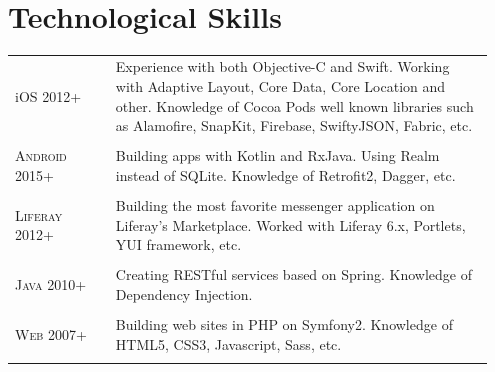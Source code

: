 \documentclass[10pt]{article} %
\begin{document}
{\begin{minipage}[t]{0.5\textwidth}
\begin{tabular}{@{}rl@{}}
\end{tabular}\\[10pt]



\section{Technological Skills} 

\medskip
\begin{tabular}{@{}p{0.2\linewidth}p{0.75\linewidth}@{}} 

\large{i}\textsc{OS} \newline \small\textsc{2012+} & 
Experience with both Objective-C and Swift. Working with Adaptive Layout, Core Data, Core Location and other.\newline
Knowledge of Cocoa Pods well known libraries such as Alamofire, SnapKit, Firebase, 
\newline SwiftyJSON, Fabric, etc. \\
&\\

\large\textsc{Android} \newline \small\textsc{2015+} & 
Building apps with Kotlin and RxJava. Using Realm instead of SQLite.
Knowledge of  Retrofit2, Dagger, etc. \\
&\\

\large\textsc{Liferay} \newline \small\textsc{2012+} & 
Building the most favorite messenger application on Liferay's Marketplace.
Worked with Liferay 6.x, Portlets, YUI framework, etc. \\
&\\

\large\textsc{Java} \newline \small\textsc{2010+} & 
Creating RESTful services based on Spring. Knowledge of Dependency Injection. \\
&\\

\large\textsc{Web} \newline \small\textsc{2007+} & 
Building web sites in PHP on Symfony2. Knowledge of HTML5, CSS3, Javascript, Sass, etc.  \\
&\\


\end{tabular}
\end{minipage}}
\end{document}
